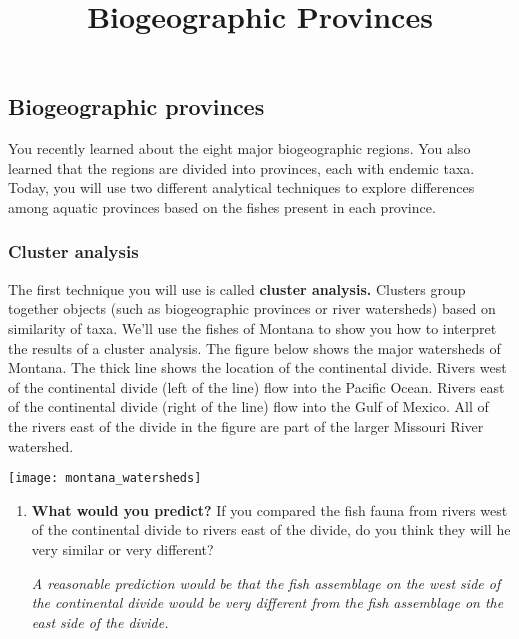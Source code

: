 \documentclass[11pt]{article}
\title{Biogeographic Provinces}
\author{}
\date{}                                           %
\begin{document}
\thispagestyle{first_page}

\subsection*{Biogeographic provinces}

You recently learned about the eight major biogeographic regions. 
You also learned that the regions are divided into provinces, each with
endemic taxa.  Today, you will use two different analytical techniques to explore 
differences among aquatic provinces based on the fishes present in each 
province.

\subsubsection*{Cluster analysis}

The first technique you will use is called \textbf{cluster analysis.} Clusters
group together objects (such as biogeographic provinces or river watersheds)
based on similarity of taxa. We'll use the fishes of Montana to show you
how to interpret the results of a cluster analysis.  The figure below shows the
major watersheds of Montana.  The thick line shows the location of the
continental divide. Rivers west of the continental divide (left of the line)
flow into the Pacific Ocean. Rivers east of the continental divide (right
of the line) flow into the Gulf of Mexico.  All of the rivers east of the divide
in the figure are part of the larger Missouri River watershed.

\begin{center}
	\texttt{[image: montana\_watersheds]}
\end{center}

\begin{enumerate}[resume]
\item \textbf{What would you predict?} If you compared the fish fauna from 
rivers west of the continental divide  to rivers east of the divide, do you think
they will he very similar or very different? %

\emph{A reasonable prediction would be that the fish assemblage on the west side of the continental divide would be very different from the fish assemblage on the east side of the divide.}
\end{enumerate}
\end{document}

